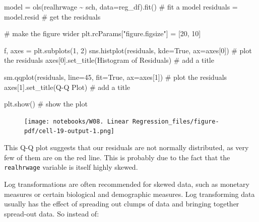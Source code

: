 \documentclass[
  letterpaper,
  DIV=11,
  numbers=noendperiod]{scrreprt}
\newenvironment{Shaded}{\begin{snugshade}}{\end{snugshade}}
\newcommand{\CommentTok}[1]{\textcolor[rgb]{0.37,0.37,0.37}{#1}}
\newcommand{\DecValTok}[1]{\textcolor[rgb]{0.68,0.00,0.00}{#1}}
\newcommand{\NormalTok}[1]{\textcolor[rgb]{0.00,0.23,0.31}{#1}}
\newcommand{\OperatorTok}[1]{\textcolor[rgb]{0.37,0.37,0.37}{#1}}
\newcommand{\StringTok}[1]{\textcolor[rgb]{0.13,0.47,0.30}{#1}}
\newcommand{\VariableTok}[1]{\textcolor[rgb]{0.07,0.07,0.07}{#1}}
\begin{document}
\begin{Shaded}
\begin{Highlighting}[]
\NormalTok{model }\OperatorTok{=}\NormalTok{ ols(}\StringTok{\textquotesingle{}realhrwage \textasciitilde{}  sch\textquotesingle{}}\NormalTok{, data}\OperatorTok{=}\NormalTok{reg\_df).fit()  }\CommentTok{\# fit a model}
\NormalTok{residuals }\OperatorTok{=}\NormalTok{ model.resid }\CommentTok{\# get the residuals}

\CommentTok{\# make the figure wider}
\NormalTok{plt.rcParams[}\StringTok{"figure.figsize"}\NormalTok{] }\OperatorTok{=}\NormalTok{ [}\DecValTok{20}\NormalTok{, }\DecValTok{10}\NormalTok{]}

\NormalTok{f, axes }\OperatorTok{=}\NormalTok{ plt.subplots(}\DecValTok{1}\NormalTok{, }\DecValTok{2}\NormalTok{)}
\NormalTok{sns.histplot(residuals, kde}\OperatorTok{=}\VariableTok{True}\NormalTok{, ax}\OperatorTok{=}\NormalTok{axes[}\DecValTok{0}\NormalTok{]) }\CommentTok{\# plot the residuals}
\NormalTok{axes[}\DecValTok{0}\NormalTok{].set\_title(}\StringTok{\textquotesingle{}Histogram of Residuals\textquotesingle{}}\NormalTok{) }\CommentTok{\# add a title}

\NormalTok{sm.qqplot(residuals, line}\OperatorTok{=}\StringTok{\textquotesingle{}45\textquotesingle{}}\NormalTok{, fit}\OperatorTok{=}\VariableTok{True}\NormalTok{,  ax}\OperatorTok{=}\NormalTok{axes[}\DecValTok{1}\NormalTok{]) }\CommentTok{\# plot the residuals}
\NormalTok{axes[}\DecValTok{1}\NormalTok{].set\_title(}\StringTok{\textquotesingle{}Q{-}Q Plot\textquotesingle{}}\NormalTok{) }\CommentTok{\# add a title}

\NormalTok{plt.show() }\CommentTok{\# show the plot}
\end{Highlighting}
\end{Shaded}

\begin{figure}[H]

{\centering \texttt{[image: notebooks/W08. Linear Regression\_files/figure-pdf/cell-19-output-1.png]}

}

\end{figure}

This Q-Q plot suggests that our residuals are not normally distributed,
as very few of them are on the red line. This is probably due to the
fact that the \texttt{realhrwage} variable is itself highly skewed.

Log transformations are often recommended for skewed data, such as
monetary measures or certain biological and demographic measures. Log
transforming data usually has the effect of spreading out clumps of data
and bringing together spread-out data. So instead of:
\end{document}
